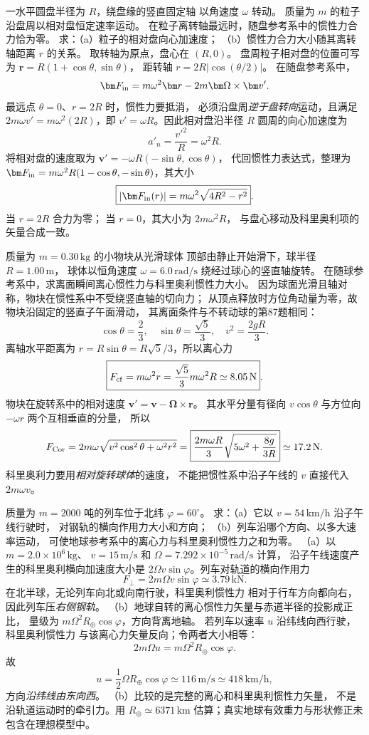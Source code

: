 一水平圆盘半径为 $R$，绕盘缘的竖直固定轴
以角速度 $\omega$ 转动。
质量为 $m$ 的粒子沿盘周以相对盘恒定速率运动。
在粒子离转轴最远时，随盘参考系中的惯性力合力恰为零。
求：（a）粒子的相对盘向心加速度；
（b）惯性力合力大小随其离转轴距离 $r$ 的关系。
\exsolution
取转轴为原点，盘心在 $(R,0)$。
盘周粒子相对盘的位置可写为
$\bm r=R(1+\cos\theta,\sin\theta)$，
距转轴 $r=2R|\cos(\theta/2)|$。
在随盘参考系中，
\[
\bm F_{\rm in}=
m\omega^2\bm r-2m\bm\Omega\times\bm v'.
\]
最远点 $\theta=0$、$r=2R$ 时，惯性力要抵消，
必须沿盘周\emph{逆于盘转向}运动，且满足
$2m\omega v'=m\omega^2(2R)$，即
$v'=\omega R$。因此相对盘沿半径 $R$ 圆周的向心加速度为
\[
\boxed{a'_n=\frac{{v'}^2}{R}=\omega^2R}.
\]
将相对盘的速度取为
$\bm v'=-\omega R(-\sin\theta,\cos\theta)$，
代回惯性力表达式，整理为
$\bm F_{\rm in}
=m\omega^2R(1-\cos\theta,-\sin\theta)$，其大小
\[
\boxed{|\bm F_{\rm in}(r)|=
m\omega^2\sqrt{4R^2-r^2}}.
\]
\excheck 当 $r=2R$ 合力为零；
当 $r=0$，其大小为 $2m\omega^2R$，
与盘心移动及科里奥利项的矢量合成一致。

质量为 $m=0.30\,\mathrm{kg}$ 的小物块从光滑球体
顶部由静止开始滑下，球半径 $R=1.00\,\mathrm m$，
球体以恒角速度 $\omega=6.0\,\mathrm{rad/s}$
绕经过球心的竖直轴旋转。
在随球参考系中，求离面瞬间离心惯性力与科里奥利惯性力大小。
\exsolution
因为球面光滑且轴对称，物块在惯性系中不受绕竖直轴的切向力；
从顶点释放时方位角动量为零，故物块沿固定的竖直子午面滑动，
其离面条件与不转动球的第87题相同：
\[
\cos\theta=\frac23,\quad
\sin\theta=\frac{\sqrt5}{3},\quad
v^2=\frac{2gR}{3}.
\]
离轴水平距离为
$r=R\sin\theta=R\sqrt5/3$，所以离心力
\[
\boxed{F_{\rm cf}=m\omega^2r
=\frac{\sqrt5}{3}m\omega^2R\simeq8.05\,\mathrm N}.
\]
物块在旋转系中的相对速度
$\bm v'=\bm v-\bm\Omega\times\bm r$。
其水平分量有径向 $v\cos\theta$ 与方位向
$-\omega r$ 两个互相垂直的分量，
所以
\[
F_{\rm Cor}=2m\omega\sqrt{v^2\cos^2\theta+\omega^2r^2}
=\boxed{\frac{2m\omega R}{3}
\sqrt{5\omega^2+\frac{8g}{3R}}}
\simeq17.2\,\mathrm N .
\]
\excheck 科里奥利力要用\emph{相对旋转球体}的速度，
不能把惯性系中沿子午线的 $v$ 直接代入 $2m\omega v$。

质量为 $m=2000$ 吨的列车位于北纬 $\varphi=60^\circ$。
求：（a）它以 $v=54\,\mathrm{km/h}$ 沿子午线行驶时，
对钢轨的横向作用力大小和方向；
（b）列车沿哪个方向、以多大速率运动，
可使地球参考系中的离心力与科里奥利惯性力之和为零。
\exsolution
（a）以 $m=2.0\times10^6\,\mathrm{kg}$、
$v=15\,\mathrm{m/s}$ 和
$\Omega=7.292\times10^{-5}\,\mathrm{rad/s}$ 计算，
沿子午线速度产生的科里奥利横向加速度大小是
$2\Omega v\sin\varphi$。列车对轨道的横向作用力
\[
\boxed{F_\perp=2m\Omega v\sin\varphi
\simeq3.79\,\mathrm{kN}}.
\]
在北半球，无论列车向北或向南行驶，科里奥利惯性力
相对于行车方向都向右，因此列车压\emph{右侧钢轨}。
（b）地球自转的离心惯性力矢量与赤道半径的投影成正比，
量级为 $m\Omega^2R_\oplus\cos\varphi$，方向背离地轴。
若列车以速率 $u$ 沿纬线向西行驶，科里奥利惯性力
与该离心力矢量反向；令两者大小相等：
\[
2m\Omega u=m\Omega^2R_\oplus\cos\varphi.
\]
故
\[
\boxed{u=\frac12\Omega R_\oplus\cos\varphi
\simeq116\,\mathrm{m/s}\simeq418\,\mathrm{km/h}},
\]
方向\emph{沿纬线由东向西}。
\excheck （b）比较的是完整的离心和科里奥利惯性力矢量，
不是沿轨道运动时的牵引力。用 $R_\oplus\simeq6371\,\mathrm{km}$
估算；真实地球有效重力与形状修正未包含在理想模型中。

